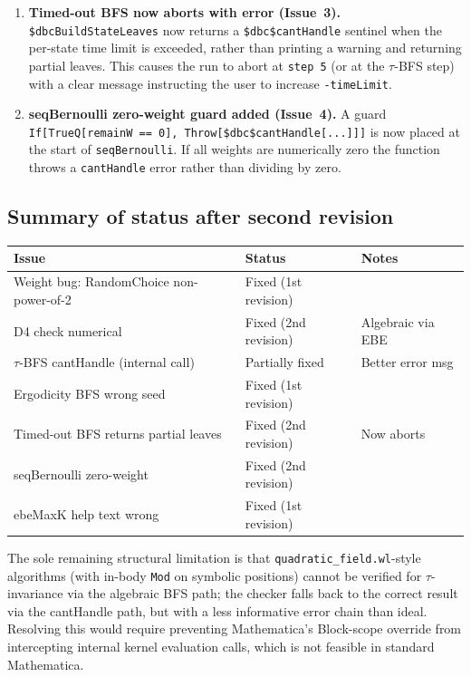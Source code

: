 \documentclass[12pt,a4paper]{article}
\theoremstyle{critical}
\theoremstyle{remark}
\begin{document}
\begin{enumerate}
\item \textbf{Timed-out BFS now aborts with error (Issue~3).}
  \texttt{\$dbcBuildStateLeaves} now returns a \texttt{\$dbc\$cantHandle} sentinel
  when the per-state time limit is exceeded, rather than printing a warning and
  returning partial leaves.  This causes the run to abort at \texttt{step~5}
  (or at the $\tau$-BFS step) with a clear message instructing the user to
  increase \texttt{-timeLimit}.

\item \textbf{seqBernoulli zero-weight guard added (Issue~4).}
  A guard \texttt{If[TrueQ[remainW == 0], Throw[\$dbc\$cantHandle[...]]]}
  is now placed at the start of \texttt{seqBernoulli}.  If all weights
  are numerically zero the function throws a \texttt{cantHandle} error
  rather than dividing by zero.

\end{enumerate}

\subsection{Summary of status after second revision}

\begin{center}
\begin{tabular}{lll}
\toprule
\textbf{Issue} & \textbf{Status} & \textbf{Notes} \\
\midrule
Weight bug: RandomChoice non-power-of-2 & Fixed (1st revision) & \\
D4 check numerical & Fixed (2nd revision) & Algebraic via EBE \\
$\tau$-BFS cantHandle (internal call) & Partially fixed & Better error msg \\
Ergodicity BFS wrong seed & Fixed (1st revision) & \\
Timed-out BFS returns partial leaves & Fixed (2nd revision) & Now aborts \\
seqBernoulli zero-weight & Fixed (2nd revision) & \\
ebeMaxK help text wrong & Fixed (1st revision) & \\
\bottomrule
\end{tabular}
\end{center}

The sole remaining structural limitation is that \texttt{quadratic\_field.wl}-style
algorithms (with in-body \texttt{Mod} on symbolic positions) cannot be verified for
$\tau$-invariance via the algebraic BFS path; the checker falls back to the correct
result via the cantHandle path, but with a less informative error chain than ideal.
Resolving this would require preventing Mathematica's Block-scope override from
intercepting internal kernel evaluation calls, which is not feasible in standard
Mathematica.
\end{document}
